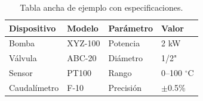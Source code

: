 \begin{table}[!t]            %
  \centering                   %
  \caption{Tabla ancha de ejemplo con especificaciones.} \label{tab:ancha} %
  \begin{tabular}{l l l l}     %
    \toprule                   %
    Dispositivo & Modelo & Parámetro & Valor \\ %
    \midrule                   %
    Bomba & XYZ-100 & Potencia & 2 kW \\
    Válvula & ABC-20 & Diámetro & 1/2" \\
    Sensor & PT100 & Rango & 0--100 $^{\circ}$C \\
    Caudalímetro & F-10 & Precisión & \(\pm\)0.5\% \\
    \bottomrule                %
  \end{tabular}
\end{table}

